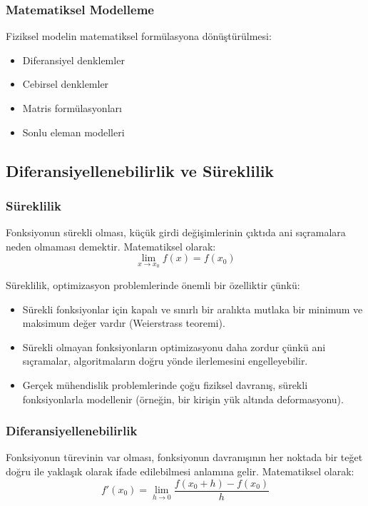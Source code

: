 \subsubsection{Matematiksel Modelleme}
Fiziksel modelin matematiksel formülasyona dönüştürülmesi:
\begin{itemize}
    \item Diferansiyel denklemler
    \item Cebirsel denklemler
    \item Matris formülasyonları
    \item Sonlu eleman modelleri
\end{itemize}

\subsection{Diferansiyellenebilirlik ve Süreklilik}

\subsubsection{Süreklilik}
Fonksiyonun sürekli olması, küçük girdi değişimlerinin çıktıda ani sıçramalara neden olmaması demektir. Matematiksel olarak:
\begin{equation}
\lim_{x \to x_0} f(x) = f(x_0)
\end{equation}

\begin{tcolorbox}[title=Süreklilik ve Optimizasyon İlişkisi]
Süreklilik, optimizasyon problemlerinde önemli bir özelliktir çünkü:
\begin{itemize}
    \item Sürekli fonksiyonlar için kapalı ve sınırlı bir aralıkta mutlaka bir minimum ve maksimum değer vardır (Weierstrass teoremi).
    \item Sürekli olmayan fonksiyonların optimizasyonu daha zordur çünkü ani sıçramalar, algoritmaların doğru yönde ilerlemesini engelleyebilir.
    \item Gerçek mühendislik problemlerinde çoğu fiziksel davranış, sürekli fonksiyonlarla modellenir (örneğin, bir kirişin yük altında deformasyonu).
\end{itemize}
\end{tcolorbox}

\subsubsection{Diferansiyellenebilirlik}
Fonksiyonun türevinin var olması, fonksiyonun davranışının her noktada bir teğet doğru ile yaklaşık olarak ifade edilebilmesi anlamına gelir. Matematiksel olarak:
\begin{equation}
f'(x_0) = \lim_{h \to 0} \frac{f(x_0 + h) - f(x_0)}{h}
\end{equation}

